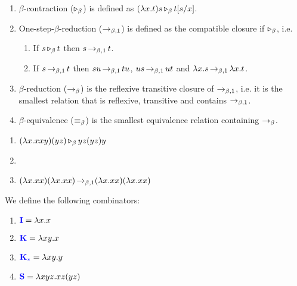 \begin{boxdefi}
    \hfill
    \begin{enumerate}
        \item \alert{$\beta$-contraction ($\operatorname{\triangleright_{\beta}}$)} is defined as $(\lambda x. t) s \operatorname{\triangleright_{\beta}} t [s/x]$.
        \item {\alert{One-step-$\beta$-reduction ($\operatorname{\to_{\beta, 1}}$)} is defined as the compatible closure if $\operatorname{\triangleright_{\beta}}$, i.e.
            \begin{enumerate}
                \item If $s \operatorname{\triangleright_{\beta}} t$ then $s \operatorname{\to_{\beta, 1}} t$.
                \item If $s \operatorname{\to_{\beta, 1}} t$ then $su \operatorname{\to_{\beta, 1}} tu$, $us \operatorname{\to_{\beta, 1}} ut$ and $\lambda x. s \operatorname{\to_{\beta, 1}} \lambda x. t$.
            \end{enumerate}}
        \item \alert{$\beta$-reduction ($\operatorname{\to_{\beta}}$)} is the reflexive transitive closure of $\operatorname{\to_{\beta, 1}}$, i.e. it is the smallest relation that is reflexive, transitive and contains $\operatorname{\to_{\beta, 1}}$.
        \item \alert{$\beta$-equivalence ($\operatorname{\equiv_{\beta}}$)} is the smallest equivalence relation containing $\operatorname{\to_{\beta}}$.
    \end{enumerate}
\end{boxdefi}

\begin{example}\label{ex:betared}
    \hfill
    \begin{enumerate}
        \item $(\lambda x. xxy)(yz) \operatorname{\triangleright_{\beta}} yz(yz)y$
        \item {}
            \vspace{-2em}
        \item $(\lambda x.xx) (\lambda x. xx) \operatorname{\to_{\beta, 1}} (\lambda x.xx) (\lambda x. xx)$
    \end{enumerate}
\end{example}

\begin{boxdefi}
    We define the following combinators: 
    \begin{enumerate}
        \item $\alert{I} = \lambda x.x$
        \item $\alert{K} = \lambda xy.x$
        \item $\alert{K_*} = \lambda xy.y$
        \item $\alert{S} = \lambda xyz.xz(yz)$
    \end{enumerate}
\end{boxdefi}

